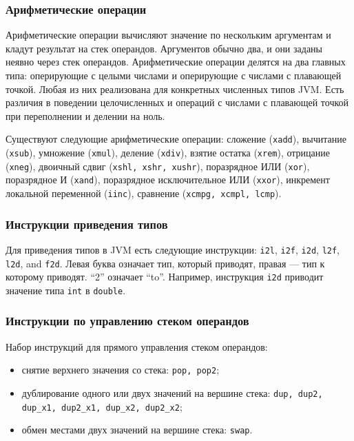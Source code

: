\subsubsection*{Арифметические операции}
Арифметические операции вычисляют значение по нескольким аргументам и кладут результат на стек операндов. Аргументов обычно два, и они заданы неявно через стек операндов. Арифметические операции делятся на два главных типа: оперирующие с целыми числами и оперирующие с числами с плавающей точкой. Любая из них реализована для конкретных численных типов JVM. Есть различия в поведении целочисленных и операций с числами с плавающей точкой при переполнении и делении на ноль. 

Существуют следующие арифметические операции: сложение (\texttt{xadd}), вычитание (\texttt{xsub}), умножение (\texttt{xmul}), деление (\texttt{xdiv}), взятие остатка (\texttt{xrem}), отрицание (\texttt{xneg}), двоичный сдвиг (\texttt{xshl, xshr, xushr}), поразрядное ИЛИ (\texttt{xor}), поразрядное И (\texttt{xand}), поразрядное исключительное ИЛИ (\texttt{xxor}), инкремент локальной переменной (\texttt{iinc}), сравнение (\texttt{xcmpg, xcmpl, lcmp}).

\subsubsection*{Инструкции приведения типов}
Для приведения типов в JVM есть следующие инструкции: \texttt{i2l}, \texttt{i2f}, \texttt{i2d}, \texttt{l2f}, \texttt{l2d}, and \texttt{f2d}. Левая буква означает тип, который приводят, правая --- тип к которому приводят. ``2'' означает ``to''. Например,  инструкция \texttt{i2d} приводит значение типа \texttt{int} в \texttt{double}.
  
\subsubsection*{Инструкции по управлению стеком операндов}
Набор инструкций для прямого управления стеком операндов:
\begin{itemize}
\item снятие верхнего значения со стека: \texttt{pop, pop2};
\item дублирование одного или двух значений на вершине стека: \texttt{dup, dup2, dup\_x1, dup2\_x1, dup\_x2, dup2\_x2};
\item обмен местами двух значений на вершине стека: \texttt{swap}.
\end {itemize}

